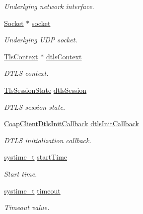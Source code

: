 \begin{DoxyCompactItemize}
\begin{DoxyCompactList}\small\item\em Underlying network interface. \end{DoxyCompactList}\item 
\hyperlink{socket_8h_aa85acfb0fa336ef495e6ba87fb88fc48}{Socket} $\ast$ \hyperlink{struct__CoapClientContext_a797ffe0cbf7df325a9cdf4edb3720dfa}{socket}
\begin{DoxyCompactList}\small\item\em Underlying U\+DP socket. \end{DoxyCompactList}\item 
\hyperlink{tls_8h_ac09f7a286c0cdf9b07ee1edd107946f5}{Tls\+Context} $\ast$ \hyperlink{struct__CoapClientContext_a338650e4c136cc6e9f98766df8ee0ffa}{dtls\+Context}
\begin{DoxyCompactList}\small\item\em D\+T\+LS context. \end{DoxyCompactList}\item 
\hyperlink{structTlsSessionState}{Tls\+Session\+State} \hyperlink{struct__CoapClientContext_ab6a4cb76acef12019779865f50cc724a}{dtls\+Session}
\begin{DoxyCompactList}\small\item\em D\+T\+LS session state. \end{DoxyCompactList}\item 
\hyperlink{coap__client_8h_a8d82e4052cfdce573905e9b9c6e302df}{Coap\+Client\+Dtls\+Init\+Callback} \hyperlink{struct__CoapClientContext_af5117c2fa48538f48c16067e852466ed}{dtls\+Init\+Callback}
\begin{DoxyCompactList}\small\item\em D\+T\+LS initialization callback. \end{DoxyCompactList}\item 
\hyperlink{compiler__port_8h_ae3e32a98d431a02106616da3071832dd}{systime\+\_\+t} \hyperlink{struct__CoapClientContext_ae78007b71b5a47a49a5806c12e403c98}{start\+Time}
\begin{DoxyCompactList}\small\item\em Start time. \end{DoxyCompactList}\item 
\hyperlink{compiler__port_8h_ae3e32a98d431a02106616da3071832dd}{systime\+\_\+t} \hyperlink{struct__CoapClientContext_acf99ee04bfa9fde4b846c888b34a4f76}{timeout}
\begin{DoxyCompactList}\small\item\em Timeout value. \end{DoxyCompactList}\item 

\end{DoxyCompactItemize}
